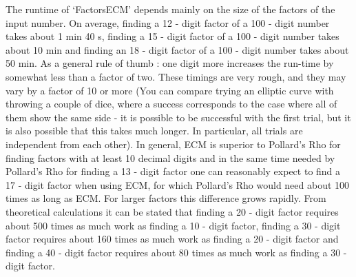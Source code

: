 The runtime of `FactorsECM' depends mainly on the size of the factors
of the input number.
On average, finding a 12 - digit factor of a 100 - digit number
takes about 1 min 40 s, finding a 15 - digit factor of a 100 - digit
number takes about 10 min and finding an 18 - digit factor of a 100 -
digit number takes about 50 min.
As a general rule of thumb : one digit more increases the run-time
by somewhat less than a factor of two.
These timings are very rough, and they may vary by a factor of 10 or more
(You can compare trying an elliptic curve with throwing a couple of dice,
where a success corresponds to the case where all of them show the same
side - it is possible to be successful with the first trial, but it is
also possible that this takes much longer. In particular, all trials are
independent from each other).
In general, ECM is superior to Pollard's Rho for finding factors with at
least 10 decimal digits and in the same time needed by Pollard's Rho for
finding a 13 - digit factor one can reasonably expect to find a
17 - digit factor when using ECM, for which Pollard's Rho would need 
about 100 times as long as ECM. For larger factors this difference
grows rapidly.
From theoretical calculations it can be stated that finding a
20 - digit factor requires about 500 times as much work as finding a
10 - digit factor, finding a 30 - digit factor requires about 160 times
as much work as finding a 20 - digit factor and finding a 40 - digit
factor requires about 80 times as much work as finding a 30 - digit
factor.

